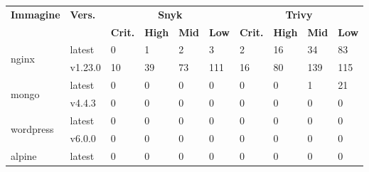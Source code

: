 \begin{table}[h]
   \centering
   \begin{tabularx}{\textwidth}{|l|l|X|X|X|X|X|X|X|X|}
      \hline
      \textbf{Immagine}          & \textbf{Vers.} & \multicolumn{4}{c|}{\textbf{Snyk}} & \multicolumn{4}{c|}{\textbf{Trivy}}                                                                                              \\ \cline{3-10}
                                 &                & \textbf{Crit.}                     & \textbf{High}                       & \textbf{Mid} & \textbf{Low} & \textbf{Crit.} & \textbf{High} & \textbf{Mid} & \textbf{Low} \\ \hline
      \multirow{2}{*}{nginx}     & latest         & 0                                  & 1                                   & 2            & 3            & 2              & 16            & 34           & 83           \\ \cline{2-10}
                                 & v1.23.0        & 10                                 & 39                                  & 73           & 111          & 16             & 80            & 139          & 115          \\ \hline
      \multirow{2}{*}{mongo}     & latest         & 0                                  & 0                                   & 0            & 0            & 0              & 0             & 1            & 21            \\ \cline{2-10}
                                 & v4.4.3         & 0                                  & 0                                   & 0            & 0            & 0              & 0             & 0            & 0            \\ \hline
      \multirow{2}{*}{wordpress} & latest         & 0                                  & 0                                   & 0            & 0            & 0              & 0             & 0            & 0            \\ \cline{2-10}
                                 & v6.0.0         & 0                                  & 0                                   & 0            & 0            & 0              & 0             & 0            & 0            \\ \hline
      \multirow{2}{*}{alpine}    & latest         & 0                                  & 0                                   & 0            & 0            & 0              & 0             & 0            & 0            \\ \cline{2-10}

\end{tabularx}
\end{table}

